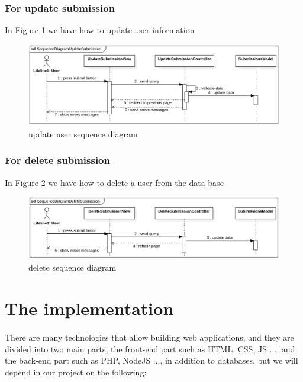 \documentclass[12pt,a4paper]{article}
\begin{document}
		\subsubsection{For update submission}
		In Figure \ref{fig:submission-update-s-d} we have how to update user information
		
			\begin{figure}[b]
				\centering
				\includegraphics[width=\textwidth]{diagrams/submission_update_sequence.png}
				\caption{update user sequence diagram}
				\label{fig:submission-update-s-d}
			\end{figure}
		
		\subsubsection{For delete submission}
		In Figure \ref{fig:submission-delete-s-d} we have how to delete a user from the data base
		
			\begin{figure}[b]
				\centering
				\includegraphics[width=\textwidth]{diagrams/submission_delete_sequence.png}
				\caption{delete sequence diagram}
				\label{fig:submission-delete-s-d}
			\end{figure}
	
	\clearpage
	\section{The implementation}
	\paragraph{}
	There are many technologies that allow building web applications, and they are divided into two main parts, the front-end part such as HTML, CSS, JS ..., and the back-end part such as PHP, NodeJS ..., in addition to databases, but we will depend in our project on the following:
\end{document}
